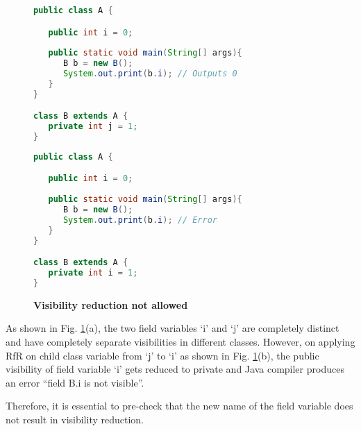 \begin{figure}[th]
\centering
\begin{minipage}[t]{0.75\linewidth}
\begin{lstlisting}[language=java, basicstyle=\scriptsize\ttfamily,frame=single]
public class A {

   public int i = 0;
	
   public static void main(String[] args){
      B b = new B();
      System.out.print(b.i); // Outputs 0
   }
}

class B extends A {
   private int j = 1;
}
\end{lstlisting}
\end{minipage}
\hfill
\begin{minipage}[t]{0.75\linewidth}
\begin{lstlisting}[language=java, basicstyle=\scriptsize\ttfamily,frame=single]
public class A {

   public int i = 0;
	
   public static void main(String[] args){
      B b = new B();
      System.out.print(b.i); // Error
   }
}

class B extends A {
   private int i = 1;
}
\end{lstlisting}
\end{minipage}
\caption{\textbf{Visibility reduction not allowed}}
\label{figure:jtoi}
\end{figure}


As shown in Fig. \ref{figure:jtoi}(a), the two field variables `i' and `j' are completely distinct and have completely separate visibilities in different classes. However, on applying RfR on child class variable from `j' to `i' as shown in Fig. \ref{figure:jtoi}(b), the public visibility of field variable `i' gets reduced to private and Java compiler produces an error ``field B.i is not visible''. 

Therefore, it is essential to pre-check that the new name of the field variable does not result in visibility reduction. 
